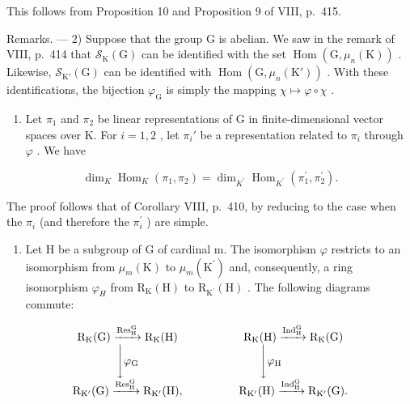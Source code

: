This follows from Proposition 10 and Proposition 9 of VIII, p.~415.

Remarks. --- 2) Suppose that the group G is abelian. We saw in the remark of VIII, p.~414 that \(\mathcal{S}_{\mathrm{K}}(\mathrm{G})\) can be identified with the set \(\operatorname{Hom}(\mathrm{G}, \mu_n(\mathrm{K}))\) . Likewise, \(\mathcal{S}_{\mathrm{K}'}(\mathrm{G})\) can be identified with \(\operatorname{Hom}(\mathrm{G}, \mu_n(\mathrm{K}'))\) . With these identifications, the bijection \(\varphi_{\mathrm{G}}\) is simply the mapping \(\chi \mapsto \varphi \circ \chi\) .

\begin{enumerate}
\def\labelenumi{\arabic{enumi})}
\setcounter{enumi}{2}
\tightlist
\item
  Let \(\pi_1\) and \(\pi_2\) be linear representations of G in finite-dimensional vector spaces over K. For \(i = 1,2\) , let \(\pi_i'\) be a representation related to \(\pi_i\) through \(\varphi\) . We have
\end{enumerate}

\[
\dim_ {K} \operatorname{Hom} _ {K} (\pi_ {1}, \pi_ {2}) = \dim_ {K ^ {\prime}} \operatorname{Hom} _ {K ^ {\prime}} (\pi_ {1} ^ {\prime}, \pi_ {2} ^ {\prime}).\tag{47}
\]

The proof follows that of Corollary VIII, p.~410, by reducing to the case when the \(\pi_{i}\) (and therefore the \(\pi_{i}^{\prime}\) ) are simple.

\begin{enumerate}
\def\labelenumi{\arabic{enumi})}
\setcounter{enumi}{3}
\tightlist
\item
  Let H be a subgroup of G of cardinal m. The isomorphism \(\varphi\) restricts to an isomorphism from \(\mu_{m}(\mathrm{K})\) to \(\mu_{m}(\mathrm{K}^{\prime})\) and, consequently, a ring isomorphism \(\varphi_{H}\) from \(\mathrm{R}_{\mathrm{K}}(\mathrm{H})\) to \(\mathrm{R}_{\mathrm{K}^{\prime}}(\mathrm{H})\) . The following diagrams commute:
\end{enumerate}

\[
\begin{array}{c c} \mathrm {R_ {K} (G)} \xrightarrow {\mathrm {Res_ {H} ^ {G}}} \mathrm {R_ {K} (H)} & \qquad \qquad \mathrm {R_ {K} (H)} \xrightarrow {\mathrm {Ind_ {H} ^ {G}}} \mathrm {R_ {K} (G)} \\ \Biggl \downarrow \varphi_ {\mathrm{G}} & \Biggl \downarrow \varphi_ {\mathrm{H}} \\ \mathrm {R_ {K^ {\prime}} (G)} \xrightarrow {\mathrm {Res_ {H} ^ {G}}} \mathrm {R_ {K^ {\prime}} (H)}, & \qquad \qquad \mathrm {R_ {K^ {\prime}} (H)} \xrightarrow {\mathrm {Ind_ {H} ^ {G}}} \mathrm {R_ {K^ {\prime}} (G)}. \end{array}
\]

